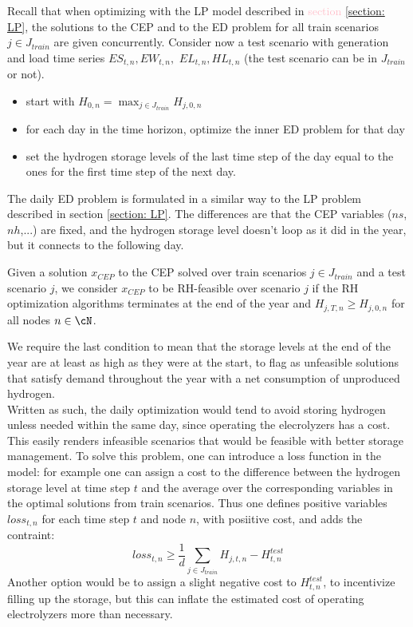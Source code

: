 Recall that when optimizing with the LP model described in \textcolor{pink}{section \ref{section: LP}}, the solutions to the CEP and to the ED problem for all train scenarios $j\in J_{train}$ are given concurrently. Consider now a test scenario with generation and load time series $ES_{t,n}, EW_{t,n},$ $EL_{t,n}, HL_{t,n}$ (the test scenario can be in $J_{train}$ or not).
\color{red}
\begin{itemize}
\item start with $H_{0,n} = \max_{j\in J_{train}} H_{j,0,n}$\\
\item for each day in the time horizon, optimize the inner ED problem for that day
\item set the hydrogen storage levels of the last time step of the day equal to the ones for the first time step of the next day.

\end{itemize}\color{black}

The daily ED problem is formulated in a similar way to the LP problem described in section \ref{section: LP}. The differences are that the CEP variables ($ns$, $nh$,...) are fixed, and the hydrogen storage level doesn't loop as it did in the year, but it connects to the following day. \\

\begin{definition}[RH-feasibility]
  Given a solution $x_{CEP}$ to the CEP solved over train scenarios $j\in J_{train}$ and a test scenario $j$, we consider $x_{CEP}$ to be RH-feasible over scenario $j$ if the RH optimization algorithms terminates at the end of the year and $H_{j,T,n}\ge H_{j,0,n}$ for all nodes $n\in\cN$.
  \end{definition}
  We require the last condition to mean that the storage levels at the end of the year are at least as high as they were at the start, to flag as unfeasible solutions that satisfy demand throughout the year with a net consumption of unproduced hydrogen.\\
  

Written as such, the daily optimization would tend to avoid storing hydrogen unless needed within the same day, since operating the elecrolyzers has a cost. This easily renders infeasible scenarios that would be feasible with better storage management. 
To solve this problem, one can introduce a loss function in the model: for example one can assign a cost to the difference between the hydrogen storage level at time step $t$ and the average over the corresponding variables in the optimal solutions from train scenarios. Thus one defines positive variables $loss_{t,n}$ for each time step $t$ and node $n$, with posiitive cost, and adds the contraint:
\begin{equation}
loss_{t,n} \ge \frac{1}{d}\sum_{j\in J_{train}} H_{j,t,n} - H^{test}_{t,n} 
\end{equation}
Another option would be to assign a slight negative cost to $H^{test}_{t,n}$, to incentivize filling up the storage, but this can inflate the estimated cost of operating electrolyzers more than necessary.\\


